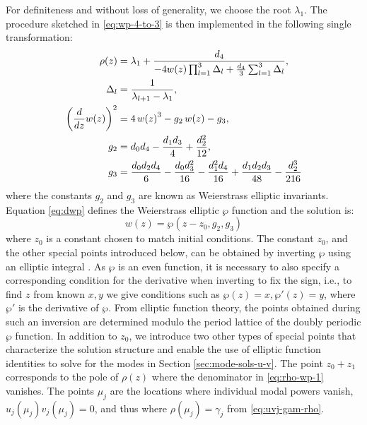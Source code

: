 \documentclass[11pt,a4paper]{article}
\numberwithin{equation}{section}
\begin{document}
For definiteness and without loss of generality, we choose the root $\lambda_1$. 
The procedure sketched in \eqref{eq:wp-4-to-3} is then implemented in the following single transformation:
\begin{align}
\rho{\left(z \right)} &= {\lambda}_{1} + \frac{d_4}{- 4 w{\left(z \right)} \prod_{l=1}^{3} {\Delta}_{l}  + \frac{d_4}{3} \sum_{l=1}^{3} {\Delta}_{l} }, \label{eq:rho-wp-1} \\
\Delta_l &= \frac{1}{\lambda_{l+1} - \lambda_1}, \notag \\
\left(\frac{d}{d z} w{\left(z \right)}\right)^{2} &= 4\,w{\left(z \right)}^3 - g_2\,w{\left(z \right)} - g_3, \label{eq:dwp} \\
g_{2} &= {d}_{0} {d}_{4} - \frac{{d}_{1} {d}_{3}}{4} + \frac{{d}_{2}^{2}}{12}, \label{eq:g2-d} \\
g_{3} &= \frac{{d}_{0} {d}_{2} {d}_{4}}{6} - \frac{{d}_{0} {d}_{3}^{2}}{16} - \frac{{d}_{1}^{2} {d}_{4}}{16} + \frac{{d}_{1} {d}_{2} {d}_{3}}{48} - \frac{{d}_{2}^{3}}{216} \label{eq:3-d}
\end{align}
where the constants $g_2$ and $g_3$ are known as Weierstrass elliptic invariants. 
Equation \eqref{eq:dwp} defines the Weierstrass elliptic $\wp$ function and the solution is:
\begin{equation}
w(z) = \wp (z - z_0, g_2, g_3)
\end{equation}
where $z_0$ is a constant chosen to match initial conditions. 
The constant $z_0$, and the other special points introduced below, can be obtained by inverting $\wp$ using an elliptic integral \cite{whittakerCourseModernAnalysis2021}. 
As $\wp$ is an even function, it is necessary to also specify a corresponding condition for the derivative when inverting to fix the sign, i.e., to find $z$ from known $x,y$ we give conditions such as $\wp\left(z\right)=x, \wp'\left(z\right)=y$, where $\wp'$ is the derivative of $\wp$. 
From elliptic function theory, the points obtained during such an inversion are determined modulo the period lattice of the doubly periodic $\wp$ function.
In addition to $z_0$, we introduce two other types of special points that characterize the solution structure and enable the use of elliptic function identities to solve for the modes in Section \ref{sec:mode-sols-u-v}.
The point $z_0+z_1$ corresponds to the pole of $\rho(z)$ where the denominator in \eqref{eq:rho-wp-1} vanishes.
The points $\mu_j$ are the locations where individual modal powers vanish, $u_j(\mu_j)v_j(\mu_j) = 0$, and thus where $\rho(\mu_j) = \gamma_j$ from \eqref{eq:uvj-gam-rho}.
\end{document}
